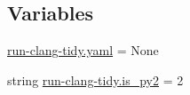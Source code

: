 \subsection*{Variables}
\begin{DoxyCompactItemize}
\item 
\hyperlink{namespacerun-clang-tidy_ae595381bb97c69bce18d8a2592c5628f}{run-\/clang-\/tidy.\+yaml} = None
\item 
string \hyperlink{namespacerun-clang-tidy_aa041a8caae6885ce927c63a08f77dd83}{run-\/clang-\/tidy.\+is\+\_\+py2} = \textquotesingle{}2\textquotesingle{}
\end{DoxyCompactItemize}
